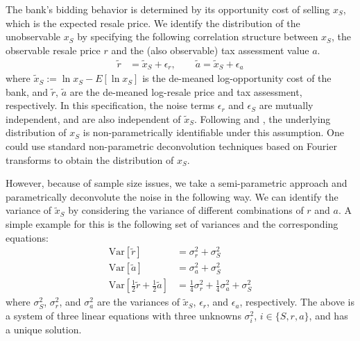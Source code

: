 \documentclass[11pt,twopage]{article}
\begin{document}
The bank's bidding behavior is determined by its opportunity cost of
selling $x_S$, which is the expected resale price. We identify the
distribution of the unobservable $x_S$ by specifying the following
correlation structure between $x_S$, the observable resale price $r$
and the (also observable) tax assessment value $a$.
%
%
%
\begin{align*}
  \tilde r & = \tilde x_S + \epsilon_r, \quad \quad \tilde a = \tilde
  x_S + \epsilon_a
\end{align*}
where $\tilde x_S:=\ln x_S-E[\ln x_S]$ is the de-meaned
log-opportunity cost of the bank, and $\tilde r$, $\tilde a$ are the
de-meaned log-resale price and tax assessment, respectively. In this
specification, the noise terms $\epsilon_r$ and $\epsilon_S$ are
mutually independent, and are also independent of $\tilde x_S$.
%
%
Following \cite{li1998nonparametric} and
\cite{krasnokutskaya2011identification}, the underlying distribution
of $x_S$ is non-parametrically identifiable under this assumption. One
could use standard non-parametric deconvolution techniques based on
Fourier transforms to obtain the distribution of $x_S$.

However, because of sample size issues, we take a semi-parametric
approach and parametrically deconvolute the noise in the following
way.  We can identify the variance of $\tilde x_S$ by considering the
variance of different combinations of $r$ and $a$. A simple example
for this is the following set of variances and the corresponding
equations:
\begin{align*}
  \text{Var}[\tilde r] & = \sigma_r^2 + \sigma_S^2 \\
  \text{Var}[\tilde a] & = \sigma_a^2 + \sigma_S^2 \\
  \text{Var}\left[\frac{1}{2}\tilde r + \frac{1}{2}\tilde a\right] & =
  \frac{1}{4}\sigma_r^2 + \frac{1}{4}\sigma_a^2+\sigma_S^2
\end{align*}
where $\sigma_S^2$, $\sigma_r^2$, and $\sigma_a^2$ are the variances
of $\tilde x_S$, $\epsilon_r$, and $\epsilon_a$, respectively. The
above is a system of three linear equations with three unknowns
$\sigma_i^2$, $i \in \{ S,r,a \}$, and has a unique solution.
\end{document}
